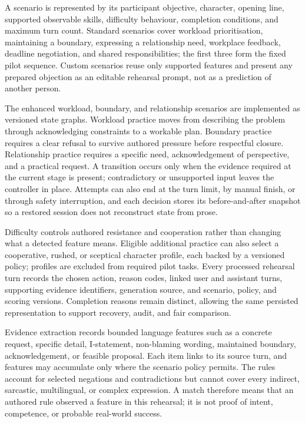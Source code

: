 A scenario is represented by its participant objective, character, opening line, supported observable skills, difficulty behaviour, completion conditions, and maximum turn count. Standard scenarios cover workload prioritisation, maintaining a boundary, expressing a relationship need, workplace feedback, deadline negotiation, and shared responsibilities; the first three form the fixed pilot sequence. Custom scenarios reuse only supported features and present any prepared objection as an editable rehearsal prompt, not as a prediction of another person.
\label{subsec:scenario-representation}
\label{subsec:frontend-preparation}

The enhanced workload, boundary, and relationship scenarios are implemented as versioned state graphs. Workload practice moves from describing the problem through acknowledging constraints to a workable plan. Boundary practice requires a clear refusal to survive authored pressure before respectful closure. Relationship practice requires a specific need, acknowledgement of perspective, and a practical request. A transition occurs only when the evidence required at the current stage is present; contradictory or unsupported input leaves the controller in place. Attempts can also end at the turn limit, by manual finish, or through safety interruption, and each decision stores its before-and-after snapshot so a restored session does not reconstruct state from prose.
\label{subsec:dialogue-transitions}

Difficulty controls authored resistance and cooperation rather than changing what a detected feature means. Eligible additional practice can also select a cooperative, rushed, or sceptical character profile, each backed by a versioned policy; profiles are excluded from required pilot tasks. Every processed rehearsal turn records the chosen action, reason codes, linked user and assistant turns, supporting evidence identifiers, generation source, and scenario, policy, and scoring versions. Completion reasons remain distinct, allowing the same persisted representation to support recovery, audit, and fair comparison.

Evidence extraction records bounded language features such as a concrete request, specific detail, I-statement, non-blaming wording, maintained boundary, acknowledgement, or feasible proposal. Each item links to its source turn, and features may accumulate only where the scenario policy permits. The rules account for selected negations and contradictions but cannot cover every indirect, sarcastic, multilingual, or complex expression. A match therefore means that an authored rule observed a feature in this rehearsal; it is not proof of intent, competence, or probable real-world success.
\label{subsec:communication-evidence}


